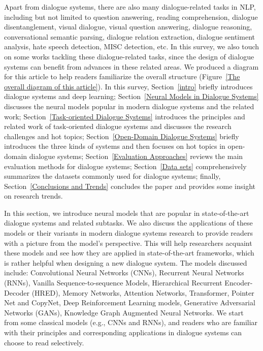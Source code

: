 Apart from dialogue systems, there are also many dialogue-related tasks in NLP, including but not limited to question answering, reading comprehension, dialogue disentanglement, visual dialogue, visual question answering, dialogue reasoning, conversational semantic parsing, dialogue relation extraction, dialogue sentiment analysis, hate speech detection, MISC detection, etc. In this survey, we also touch on some works tackling these dialogue-related tasks, since the design of dialogue systems can benefit from advances in these related areas. 
We produced a diagram for this article to help readers familiarize the overall structure (Figure~\ref{The overall diagram of this article}). In this survey, Section~\ref{intro} briefly introduces dialogue systems and deep learning; Section~\ref{Neural Models in Dialogue Systems} discusses the neural models popular in modern dialogue systems and the related work; Section~\ref{Task-oriented Dialogue Systems} introduces the principles and related work of task-oriented dialogue systems and discusses the research challenges and hot topics; Section~\ref{Open-Domain Dialogue Systems} briefly introduces the three kinds of systems and then focuses on hot topics in open-domain dialogue systems; Section~\ref{Evaluation Approaches} reviews the main evaluation methods for dialogue systems; Section~\ref{Data sets} comprehensively summarizes the datasets commonly used for dialogue systems; finally, Section~\ref{Conclusions and Trends} concludes the paper and provides some insight on research trends.

\label{Neural Models in Dialogue Systems}
In this section, we introduce neural models that are popular in state-of-the-art dialogue systems and related subtasks. We also discuss the applications of these models or their variants in modern dialogue systems research to provide readers with a picture from the model's perspective. This will help researchers acquaint these models and see how they are applied in state-of-the-art frameworks, which is rather helpful when designing a new dialogue system. The models discussed include: Convolutional Neural Networks (CNNs), Recurrent Neural Networks (RNNs), Vanilla Sequence-to-sequence Models, Hierarchical Recurrent Encoder-Decoder (HRED), Memory Networks, Attention Networks, Transformer, Pointer Net and CopyNet, Deep Reinforcement Learning models, Generative Adversarial Networks (GANs), Knowledge Graph Augmented Neural Networks. We start from some classical models (e.g., CNNs and RNNs), and readers who are familiar with their principles and corresponding applications in dialogue systems can choose to read selectively.


